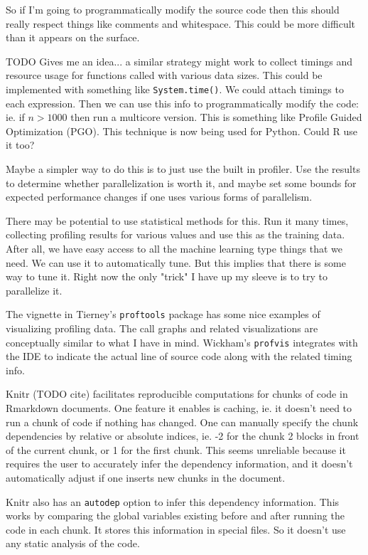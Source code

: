 \documentclass[12pt]{article}
\begin{document}
So if I'm going to programmatically modify the source code then this should really
respect things like comments and whitespace. This could be more difficult
than it appears on the surface.

TODO Gives me an idea... a similar strategy might work to collect timings and
resource usage for functions called with various data sizes. This could be
implemented with something like \texttt{System.time()}. We could
attach timings to each expression. Then we can
use this info to programmatically modify the code: ie. if $n > 1000$ then
run a multicore version. This is something like Profile Guided Optimization
(PGO). This technique is now being used for Python. Could R use it too?

Maybe a simpler way to do this is to just use the built in profiler. Use
the results to determine whether parallelization is worth it, and maybe set
some bounds for expected performance changes if one uses various forms of
parallelism. 

There may be potential to use statistical methods for this.
Run it many times, collecting profiling results for various values and use
this as the training data. After all, we have easy access to all the
machine learning type things that we need. We can use it to automatically
tune. But this implies that there is some way to tune it. Right now the
only "trick" I have up my sleeve is to try to parallelize it.

The vignette in Tierney's \texttt{proftools} package has some nice examples
of visualizing profiling data. The call graphs and related visualizations
are conceptually similar to what I have in mind.
Wickham's \texttt{profvis} integrates with the IDE to indicate the actual
line of source code along with the related timing info.

Knitr (TODO cite) facilitates reproducible computations for
chunks of code in Rmarkdown documents. One feature it enables is caching,
ie. it doesn't need to run a chunk of code if nothing has changed. One can
manually specify the chunk dependencies by relative or absolute indices,
ie. -2 for the chunk 2 blocks in front of the current chunk, or 1 for the
first chunk. This seems unreliable because it requires the user to
accurately infer the dependency information, and it doesn't automatically
adjust if one inserts new chunks in the document.

Knitr also has an \texttt{autodep} option to infer this dependency
information. This works by comparing the global variables existing before
and after running the code in each chunk. It stores this information in
special files. So it doesn't use any static analysis of the code.
\end{document}
